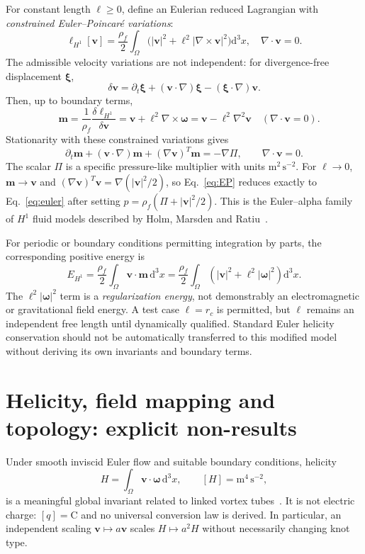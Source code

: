 \documentclass[11pt,a4paper]{article}
\newcommand{\rhoF}{\rho_{\!f}}
\newcommand{\rc}{r_c}
\newcommand{\om}{\boldsymbol{\omega}}
\newcommand{\vv}{\mathbf v}
\newcommand{\dd}{\mathrm d}
\begin{document}
For constant length $\ell\ge0$, define an Eulerian reduced Lagrangian with \emph{constrained Euler--Poincar\'e variations}:
\begin{equation}\label{eq:alphaL}
\boxed{\qquad\ell_{H^1}[\vv]=\frac{\rhoF}{2}\int_\Omega\big(|\vv|^2+\ell^2|\nabla\times\vv|^2\big)\dd^3x,\quad\nabla\cdot\vv=0.\qquad}
\end{equation}
The admissible velocity variations are not independent: for divergence-free displacement $\boldsymbol\xi$,
\begin{equation}
\delta\vv=\partial_t\boldsymbol\xi+(\vv\cdot\nabla)\boldsymbol\xi-(\boldsymbol\xi\cdot\nabla)\vv.
\end{equation}
Then, up to boundary terms,
\begin{equation}\label{eq:m}
\boxed{\quad\mathbf m=\frac{1}{\rhoF}\frac{\delta\ell_{H^1}}{\delta\vv}
=\vv+\ell^2\nabla\times\om=\vv-\ell^2\nabla^2\vv\quad(\nabla\cdot\vv=0).}
\end{equation}
Stationarity with these constrained variations gives
\begin{equation}\label{eq:EP}
\boxed{\quad\partial_t\mathbf m+(\vv\cdot\nabla)\mathbf m+(\nabla\vv)^T\mathbf m=-\nabla\Pi,
\qquad\nabla\cdot\vv=0.\quad}
\end{equation}
The scalar $\Pi$ is a specific pressure-like multiplier with units $\mathrm{m^2\,s^{-2}}$. For $\ell\rightarrow0$, $\mathbf m\to\vv$ and $(\nabla\vv)^T\vv=\nabla(|\vv|^2/2)$, so Eq.~\eqref{eq:EP} reduces exactly to Eq.~\eqref{eq:euler} after setting $p=\rhoF(\Pi+|\vv|^2/2)$. This is the Euler--alpha family of $H^1$ fluid models described by Holm, Marsden and Ratiu~\cite{Holm1998PRL,Holm1998EP}.

For periodic or boundary conditions permitting integration by parts, the corresponding positive energy is
\begin{equation}\label{eq:HEP}
\boxed{\quad E_{H^1}=\frac{\rhoF}{2}\int_\Omega\vv\cdot\mathbf m\,\dd^3x=
\frac{\rhoF}{2}\int_\Omega\left(|\vv|^2+\ell^2|\om|^2\right)\dd^3x.\quad}
\end{equation}
The $\ell^2|\om|^2$ term is a \emph{regularization energy}, not demonstrably an electromagnetic or gravitational field energy. A test case $\ell=\rc$ is permitted, but $\ell$ remains an independent free length until dynamically qualified. Standard Euler helicity conservation should not be automatically transferred to this modified model without deriving its own invariants and boundary terms.

\section{Helicity, field mapping and topology: explicit non-results}
Under smooth inviscid Euler flow and suitable boundary conditions, helicity
\begin{equation}\label{eq:helicity}
H=\int_\Omega\vv\cdot\om\,\dd^3x,\qquad [H]=\mathrm{m^4\,s^{-2}},
\end{equation}
is a meaningful global invariant related to linked vortex tubes~\cite{Moffatt1969}. It is not electric charge: $[q]=\mathrm C$ and no universal conversion law is derived. In particular, an independent scaling $\vv\mapsto a\vv$ scales $H\mapsto a^2H$ without necessarily changing knot type.
\end{document}
